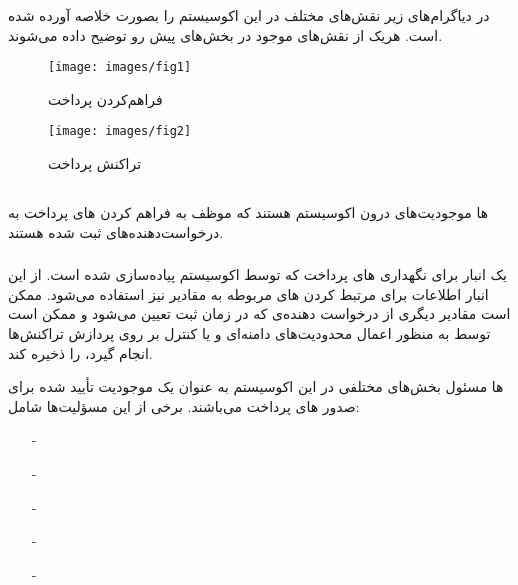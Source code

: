 \documentclass[oneside]{report}
\begin{document}
در دیاگرام‌های زیر نقش‌های مختلف در این اکوسیستم را بصورت خلاصه آورده شده است. هریک از نقش‌های موجود در بخش‌های پیش رو توضیح داده می‌شوند.

\begin{figure}
	\centering
	\texttt{[image: images/fig1]}
	\caption{فراهم‌کردن{\footnotesize  {}} پرداخت }
	\label{fig:fig1}
\end{figure}

\begin{figure}
	\centering
	\texttt{[image: images/fig2]}
	\caption{تراکنش {\footnotesize  {}} پرداخت}
	\label{fig:fig2}
\end{figure}
\newpage
\subsection{{\small {}}}
		{\normalsize  {}}ها 
		موجودیت‌های درون اکوسیستم
		{\normalsize  {}}
		هستند که موظف به فراهم کردن 
		{\normalsize  {}}های
		پرداخت به درخواست‌دهنده‌های 
		{\normalsize  {}}
		ثبت شده هستند. 
 
 \subsubsection{{\normalsize {}}}
			یک انبار برای نگهداری 
			{\normalsize {}}های
			پرداخت که توسط اکوسیستم 
			{\normalsize {}}
			پیاده‌سازی شده است. از این انبار اطلاعات برای مرتبط کردن 
			{\normalsize {}}‌های 
			مربوطه به مقادیر 
			{\normalsize {}}
			نیز استفاده می‌شود. 
			{\normalsize {}}
			ممکن است مقادیر دیگری از درخواست دهنده‌ی 
			{\normalsize {}}
			که در زمان ثبت تعیین می‌شود و ممکن است توسط 
			{\normalsize {}}
			به منظور اعمال محدودیت‌های دامنه‌ای و یا کنترل بر روی پردازش تراکنش‌ها انجام گیرد، را ذخیره کند.
					
	{\normalsize {}}ها 
	مسئول بخش‌‌های مختلفی در این اکوسیستم به عنوان  یک موجودیت تأیید شده برای صدور 
	{\normalsize {}}های 
	پرداخت می‌باشند. برخی از این مسؤلیت‌ها شامل‌:
	\begin{itemize}
		\item[-]
		\item[-]
		\item[-]
		\item[-]
		\item[-]
	\end{itemize}
					
\end{document}
